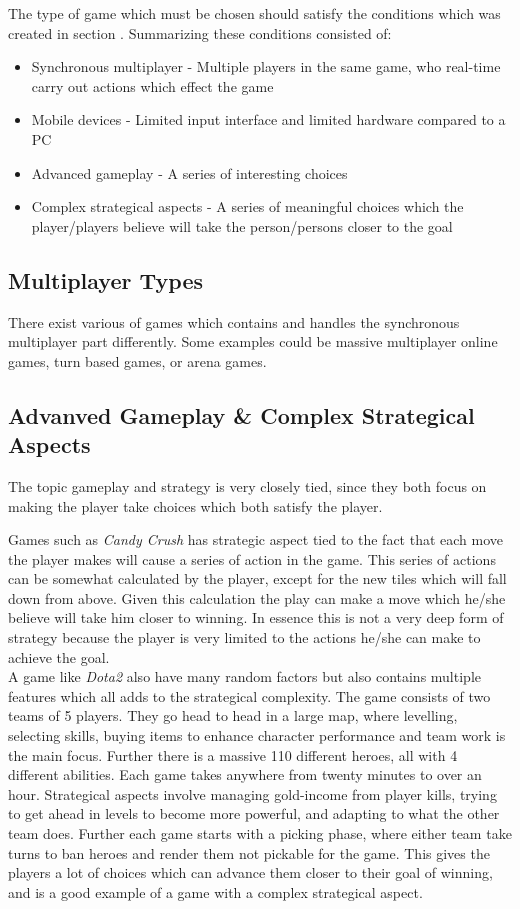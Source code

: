 The type of game which must be chosen should satisfy the conditions which was created in section \cite{sec:specifyingtheproblemstatement}.
Summarizing these conditions consisted of:
\begin{itemize}
\item Synchronous multiplayer - Multiple players in the same game, who real-time carry out actions which effect the game
\item Mobile devices - Limited input interface and limited hardware compared to a PC
\item Advanced gameplay - A series of interesting choices
\item Complex strategical aspects - A series of meaningful choices which the player/players believe will take the person/persons closer to the goal
\end{itemize}

\subsection{Multiplayer Types}
There exist various of games which contains and handles the synchronous multiplayer part differently. Some examples could be massive multiplayer online games, turn based games, or arena games. 

\subsection{Advanved Gameplay \& Complex Strategical Aspects}
The topic gameplay and strategy is very closely tied, since they both focus on making the player take choices which both satisfy the player.

Games such as \textit{Candy Crush} has strategic aspect tied to the fact that each move the player makes will cause a series of action in the game.
This series of actions can be somewhat calculated by the player, except for the new tiles which will fall down from above.
Given this calculation the play can make a move which he/she believe will take him closer to winning.
In essence this is not a very deep form of strategy because the player is very limited to the actions he/she can make to achieve the goal.\\
A game like \textit{Dota2} also have many random factors but also contains multiple features which all adds to the strategical complexity.
The game consists of two teams of 5 players. They go head to head in a large map, where levelling, selecting skills, buying items to enhance character performance and team work is the main focus. Further there is a massive 110 different heroes, all with 4 different abilities. Each game takes anywhere from twenty minutes to over an hour. 
Strategical aspects involve managing gold-income from player kills, trying to get ahead in levels to become more powerful, and adapting to what the other team does. Further each game starts with a picking phase, where either team take turns to ban heroes and render them not pickable for the game.   
This gives the players a lot of choices which can advance them closer to their goal of winning, and is a good example of a game with a complex strategical aspect.

